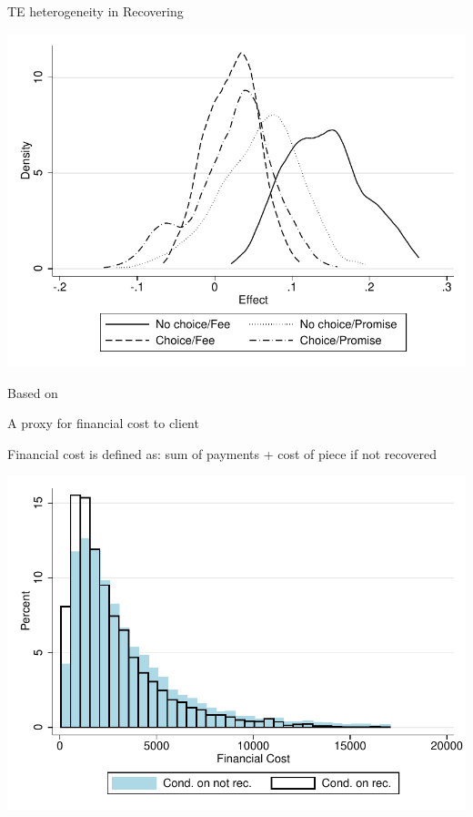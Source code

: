 \documentclass[9pt]{beamer}
\begin{document}
\begin{frame}[label = hte]{TE heterogeneity in Recovering}
    \begin{center}
        \includegraphics[width=.80\textwidth]{Figuras/he_dist_des_c.pdf}
    \end{center}
    
 Based on \hyperlink{GRF}{}   
\end{frame}






\begin{frame}{A proxy for financial cost to client}

Financial cost is defined as: sum of payments + cost of piece if not recovered

    \begin{center}
        \includegraphics[width=.7\textwidth]{Figuras/hist_fc.pdf}
    \end{center}
\end{frame}
\end{document}
